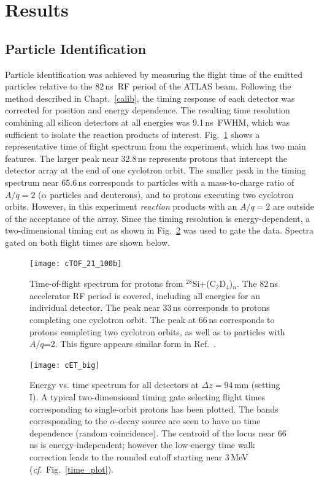 \section{Results}
\subsection{Particle Identification}
\label{results}
Particle identification was achieved by measuring the flight time of the emitted particles relative to the 82\,ns~RF period of the ATLAS beam.  Following the method described in Chapt.~\ref{calib}, the timing response of each detector was corrected for position and energy dependence.  The resulting time resolution combining all silicon detectors at all energies was 9.1\,ns~FWHM, which was sufficient to isolate the reaction products of interest.  Fig.~\ref{hTOF} shows a representative time of flight spectrum from the experiment, which has two main features.  The larger peak near 32.8\,ns represents protons that intercept the detector array at the end of one cyclotron orbit.  The smaller peak in the timing spectrum near 65.6\,ns corresponds to particles with a mass-to-charge ratio of $A/q=2$ ($\alpha$ particles and deuterons), and to protons executing two cyclotron orbits.  However, in this experiment \textit{reaction} products with an $A/q=2$ are outside of the acceptance of the array.  Since the timing resolution is energy-dependent, a two-dimensional timing cut as shown in Fig.~\ref{2d_time} was used to gate the data.  Spectra gated on both flight times are shown below.

\begin{figure}
\centering
\texttt{[image: cTOF\_21\_100b]}
\caption[Time-of-flight spectrum for protons from $^{28}$Si+(C$_2$D$_4$)$_n$]{Time-of-flight spectrum  for protons from %
$^{28}$Si+(C$_2$D$_4$)$_n$. %
 The 82\,ns accelerator RF period is covered, including all energies for an individual detector.  The peak near 33\,ns corresponds to protons completing one cyclotron orbit.  The peak at 66\,ns corresponds to protons completing two cyclotron orbits, as
well as to particles with $A/q$=2.  This figure appears similar form in Ref.~\cite{Lighthall_2010}.}
\label{hTOF}
\end{figure}

\begin{figure}
\centering
\texttt{[image: cET\_big]}%
\caption[Energy vs. time spectrum for all detectors at $\Delta z=94$\,mm (setting I)]{Energy vs. time spectrum for all detectors at $\Delta z=94$\,mm (setting I).  A typical two-dimensional timing gate selecting flight times corresponding to single-orbit protons has been plotted.  The bands corresponding to the $\alpha$-decay source are seen to have no time dependence (random coincidence).  The centroid of the locus near 66\,ns is energy-independent; however the low-energy time walk correction leads to the rounded cutoff starting near 3\,MeV (\textit{cf}.~Fig.~\ref{time_plot}).}%
\label{2d_time}%
\end{figure}

